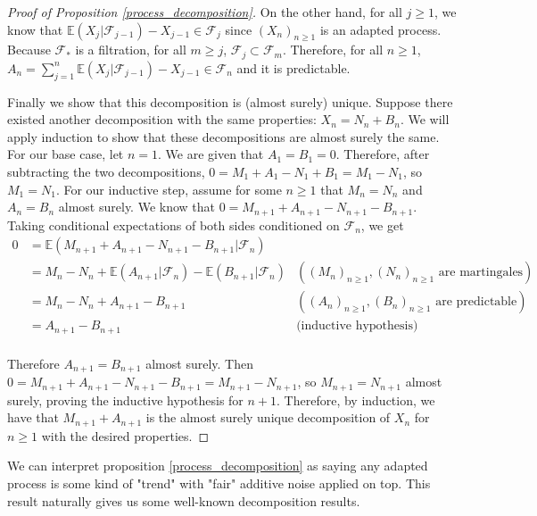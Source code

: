 \begin{proof}[Proof of Proposition \ref{process_decomposition}]
    On the other hand, for all \(j \geq 1\), we know that \(\mathbb{E}(X_{j}|\mathcal{F}_{j-1}) - X_{j-1} \in \mathcal{F}_{j}\) since \((X_{n})_{n \geq 1}\) is an adapted process. Because \(\mathcal{F}_{*}\) is a filtration, for all \(m \geq j\), \(\mathcal{F}_{j} \subset \mathcal{F}_{m}\). Therefore, for all \(n \geq 1\), \(A_{n} =  \sum\limits_{j=1}^{n} \mathbb{E}(X_{j}|\mathcal{F}_{j-1}) - X_{j-1} \in \mathcal{F}_{n}\) and it is predictable.

    Finally we show that this decomposition is (almost surely) unique. Suppose there existed another decomposition with the same properties: \(X_{n} = N_{n} + B_{n}\). We will apply induction to show that these decompositions are almost surely the same. For our base case, let \(n = 1\). We are given that \(A_{1} = B_{1} = 0\). Therefore, after subtracting the two decompositions, \(0 = M_{1} + A_{1} - N_{1} + B_{1} = M_{1} - N_{1}\), so \(M_{1} = N_{1}\). For our inductive step, assume for some \(n \geq 1\) that \(M_{n} = N_{n}\) and \(A_{n} = B_{n}\) almost surely. We know that \(0 = M_{n+1} + A_{n+1} - N_{n+1} - B_{n+1}\). Taking conditional expectations of both sides conditioned on \(\mathcal{F}_{n}\), we get
    \begin{align*}
        0 &= \mathbb{E}(M_{n+1} + A_{n+1} - N_{n+1} - B_{n+1}|\mathcal{F}_{n}) \\
        &= M_{n} - N_{n} + \mathbb{E}(A_{n+1}|\mathcal{F}_{n}) - \mathbb{E}(B_{n+1}|\mathcal{F}_{n}) & ((M_{n})_{n \geq 1}, (N_{n})_{n \geq 1} \text{ are martingales})\\
        &= M_{n} - N_{n} + A_{n+1} - B_{n+1} & ((A_{n})_{n \geq 1}, (B_{n})_{n \geq 1} \text{ are predictable}) \\
        &= A_{n+1} - B_{n+1} & \text{(inductive hypothesis)} \\
    \end{align*}

    Therefore \(A_{n+1} = B_{n+1}\) almost surely. Then \(0 = M_{n+1} + A_{n+1} - N_{n+1} - B_{n+1} = M_{n+1} - N_{n+1}\), so \(M_{n+1} = N_{n+1}\) almost surely, proving the inductive hypothesis for \(n+1\). Therefore, by induction, we have that  \(M_{n+1} + A_{n+1}\) is the almost surely unique decomposition of \(X_{n}\) for \(n \geq 1\) with the desired properties.
\end{proof}

We can interpret proposition \ref{process_decomposition} as saying any adapted process is some kind of "trend" with "fair" additive noise applied on top. This result naturally gives us some well-known decomposition results.

